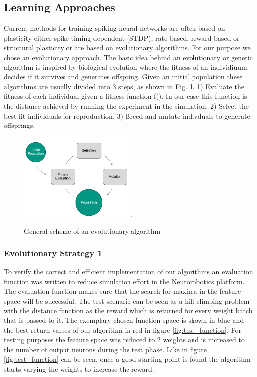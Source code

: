 \subsection{Learning Approaches}
Current methods for training spiking neural networks are often based on plasticity either spike-timing-dependent (STDP), rate-based, reward based or structural plasticity or are based on evolutionary algorithms. %
 For our purpose we chose an evolutionary approach. The basic idea behind an evolutionary or genetic algorithm is inspired by biological evolution where the fitness of an individiuum decides if it survives and generates offspring. Given an initial population these algorithms are usually divided into 3 steps, as shown in Fig. \ref{evo_base}. 1) Evaluate the fitness of each individual given a fitness function f(). In our case this function is the distance achieved by running the experiment in the simulation. 2) Select the best-fit individuals for reproduction. 3) Breed and mutate indivduals to generate offsprings.

\begin{figure}[H]
	\centering
	\includegraphics[width=2.2in]{img/evo_base.png}
	\DeclareGraphicsExtensions.
	\caption{General scheme of an evolutionary algorithm}
	\label{evo_base}
\end{figure}

\subsubsection{Evolutionary Strategy 1}


To verify the correct and efficient implementation of our algorithms an evaluation function was written to reduce simulation effort in the Neurorobotics platform. The evaluation function makes sure that the search for maxima in the feature space will be successful. The test scenario can be seen as a hill climbing problem with the distance function as the reward which is returned for every weight batch that is passed to it. The exemplary chosen function space is shown in blue and the best return values of our algorithm in red in figure \ref{fig:test_function}. For testing purposes the feature space was reduced to 2 weights and is increased to the number of output neurons during the test phase.
Like in figure \ref{fig:test_function} can be seen, once a good starting point is found the algorithm starts varying the weights to increase the reward. 

